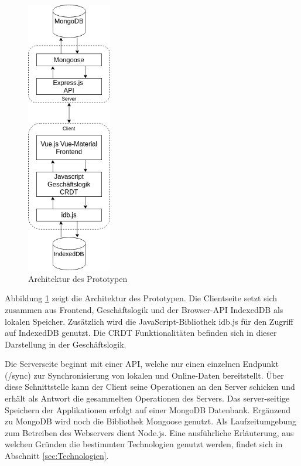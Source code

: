 \documentclass[a4paper, 12pt]{scrreprt}
\begin{document}
\begin{figure}[H]
	\centering
	\includegraphics[width=0.33\textwidth]{architektur.png}
	\caption{Architektur des Prototypen}
	\label{fig:architektur}
\end{figure}

Abbildung \ref{fig:architektur} zeigt die Architektur des Prototypen. Die Clientseite setzt sich zusammen aus Frontend, Geschäftslogik und der Browser-API IndexedDB als lokalen Speicher. Zusätzlich wird die JavaScript-Bibliothek idb.js für den Zugriff auf IndexedDB genutzt. Die CRDT Funktionalitäten befinden sich in dieser Darstellung in der Geschäftslogik. 

Die Serverseite beginnt mit einer API, welche nur einen einzelnen Endpunkt (/sync) zur Synchronisierung von lokalen und Online-Daten bereitstellt. Über diese Schnittstelle kann der Client seine Operationen an den Server schicken und erhält als Antwort die gesammelten Operationen des Servers. Das server-seitige Speichern der Applikationen erfolgt auf einer MongoDB Datenbank. Ergänzend zu MongoDB wird noch die Bibliothek Mongoose genutzt. Als Laufzeitumgebung zum Betreiben des Webservers dient Node.js. Eine ausführliche Erläuterung, aus welchen Gründen die bestimmten Technologien genutzt werden, findet sich in Abschnitt \ref{sec:Technologien}.
\end{document}
